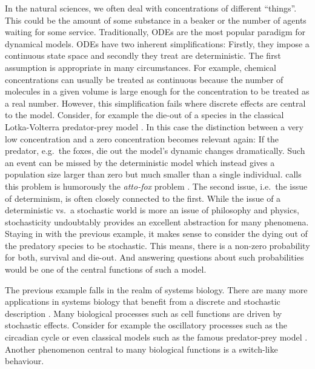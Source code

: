 In the natural sciences, we often deal with concentrations of different ``things''.
This could be the amount of some substance in a beaker or the number of agents waiting for some service.
Traditionally, \aclp{ODE} are the most popular paradigm for dynamical models.
\Aclp{ODE} have two inherent simplifications: Firstly, they impose a continuous state space and secondly they treat are deterministic.
The first assumption is appropriate in many circumstances.
For example, chemical concentrations can usually be treated as continuous because the number of molecules in a given volume is large enough for the concentration to be treated as a real number.
However, this simplification fails where discrete effects are central to the model.
Consider, for example the die-out of a species in the classical Lotka-Volterra predator-prey model \parencite{lotka1925elements}.
In this case the distinction between a very low concentration and a zero concentration becomes relevant again:
If the predator, e.g.\ the foxes, die out the model's dynamic changes dramatically.
Such an event can be missed by the deterministic model which instead gives a population size larger than zero but much smaller than a single individual.
 calls this problem is humorously the \emph{atto-fox} problem \parencite{mollison1991dependence}.
The second issue, i.e.\ the issue of determinism, is often closely connected to the first.
While the issue of a deterministic vs.\ a stochastic world is more an issue of philosophy and physics, stochasticity undoubtably provides an excellent abstraction for many phenomena.
Staying in with the previous example, it makes sense to consider the dying out of the predatory species to be stochastic.
This means, there is a non-zero probability for both, survival and die-out.
And answering questions about such probabilities would be one of the central functions of such a model.

The previous example falls in the realm of systems biology.
There are many more applications in systems biology that benefit from a discrete and stochastic description \parencite{wilkinson2018stochastic,BuchWolkenhauer}.
Many biological processes such as cell functions are driven by stochastic effects.
Consider for example the oscillatory processes such as the circadian cycle \parencite{asgari2019mathematical} or even classical models such as the famous predator-prey model \parencite{lotka1925elements}.
Another phenomenon central to many biological functions is a switch-like behaviour.


